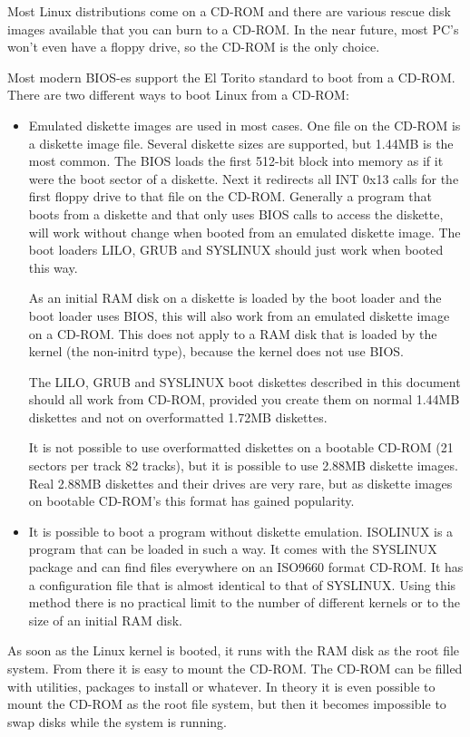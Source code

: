 \documentclass[12pt,a4paper]{article}
\begin{document}
Most Linux distributions come on a CD-ROM and there are various rescue
disk images available that you can burn to a CD-ROM. In the near
future, most PC's won't even have a floppy drive, so the CD-ROM is the
only choice. 

Most modern BIOS-es support the El Torito standard to boot from a
CD-ROM. There are two different ways to boot Linux from a CD-ROM:
\begin{itemize}
\item Emulated diskette images are used in most cases. One file on the
  CD-ROM is a diskette image file. Several diskette sizes are
  supported, but 1.44MB is the most common. The BIOS loads the first
  512-bit block into memory as if it were the boot sector of a
  diskette. Next it redirects all INT 0x13 calls for the first floppy
  drive to that file on the CD-ROM. Generally a program that boots
  from a diskette and that only uses BIOS calls to access the
  diskette, will work without change when booted from an emulated
  diskette image. The boot loaders LILO, GRUB and SYSLINUX should just
  work when booted this way. 

  As an initial RAM disk on a diskette is loaded by the boot loader
  and the boot loader uses BIOS, this will also work from an emulated
  diskette image on a CD-ROM. This does not apply to a RAM disk that
  is loaded by the kernel (the non-initrd type), because the kernel
  does not use BIOS.

  The LILO, GRUB and SYSLINUX boot diskettes described in this
  document should all work from CD-ROM, provided you create them on
  normal 1.44MB diskettes and not on overformatted 1.72MB diskettes. 

  It is not possible to use overformatted diskettes on a bootable
  CD-ROM (21 sectors per track 82 tracks), but it is possible to use
  2.88MB diskette images. Real 2.88MB diskettes and their drives are
  very rare, but as diskette images on bootable CD-ROM's this format has
  gained popularity.
\item It is possible to boot a program without diskette
  emulation. ISOLINUX is a program that can be loaded in such a
  way. It comes with the SYSLINUX package and can find files
  everywhere on an ISO9660 format CD-ROM.  It has a configuration file
  that is almost identical to that of SYSLINUX. Using this method
  there is no practical limit to the number of different kernels or to
  the size of an initial RAM disk.
\end{itemize}
As soon as the Linux kernel is booted, it runs with the RAM disk as
the root file system. From there it is easy to mount the CD-ROM. The
CD-ROM can be filled with utilities, packages to install or whatever.
In theory it is even possible to mount the CD-ROM as the root file
system, but then it becomes impossible to swap disks while the system
is running.
\end{document}
